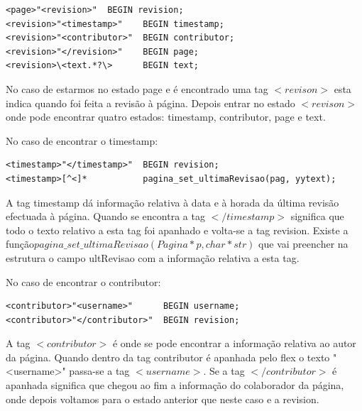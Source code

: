 \documentclass[11pt, a4paper, oneside]{article}
\begin{document}
\begin{verbatim}
<page>"<revision>"  BEGIN revision;
<revision>"<timestamp>"    BEGIN timestamp;
<revision>"<contributor>"  BEGIN contributor;
<revision>"</revision>"    BEGIN page;
<revision>\<text.*?\>      BEGIN text;
\end{verbatim}


No caso de estarmos no estado page e é encontrado uma tag \begin{math}<revison>\end{math} esta indica quando foi feita a revisão à página. Depois entrar no estado \begin{math}<revison>\end{math} onde pode encontrar quatro estados: timestamp, contributor, page e text.

No caso de encontrar o timestamp:
\begin{verbatim}
<timestamp>"</timestamp>"  BEGIN revision;
<timestamp>[^<]*           pagina_set_ultimaRevisao(pag, yytext);
\end{verbatim}

A tag timestamp dá informação relativa à data e à horada da última revisão efectuada à página.
Quando se encontra a tag \begin{math}</timestamp>\end{math} significa que todo o texto relativo a esta tag foi apanhado e volta-se a tag revision.
Existe a função\begin{math}pagina\_set\_ultimaRevisao(Pagina* p, char* str)\end{math} que vai preencher na estrutura o campo ultRevisao com a informação relativa a esta tag.


No caso de encontrar o contributor:
\begin{verbatim}
<contributor>"<username>"      BEGIN username;
<contributor>"</contributor>"  BEGIN revision;

\end{verbatim}
A tag \begin{math}<contributor>\end{math} é onde se pode encontrar a informação relativa ao autor da página. 
Quando dentro da tag contributor é apanhada pelo flex o texto "<username>" passa-se a tag  \begin{math}<username>\end{math}.
Se a tag \begin{math}</contributor>\end{math} é apanhada significa que chegou ao fim a informação do colaborador da página, onde depois voltamos para o estado anterior que neste caso e a revision. 
\end{document}

